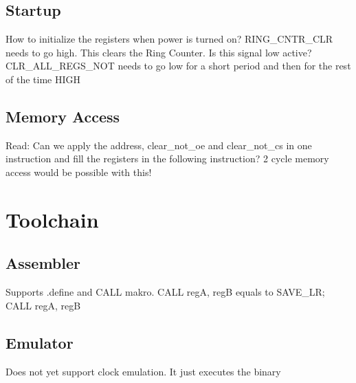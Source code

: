 \documentclass[a4paper, 12pt]{article}
\begin{document}
	\subsection{Startup}
	How to initialize the registers when power is turned on?
	RING\_CNTR\_CLR needs to go high. This clears the Ring Counter. Is this signal low active?
	CLR\_ALL\_REGS\_NOT needs to go low for a short period and then for the rest of the time HIGH
	\subsection{Memory Access}
	Read: Can we apply the address, clear\_not\_oe and clear\_not\_cs in one instruction and fill the registers in the following instruction? 2 cycle memory access would be possible with this!
	\section{Toolchain}
	\subsection{Assembler}
	Supports .define  and CALL makro. CALL regA, regB equals to SAVE\_LR; CALL regA, regB
	\subsection{Emulator}
	Does not yet support clock emulation. It just executes the binary
\end{document}
